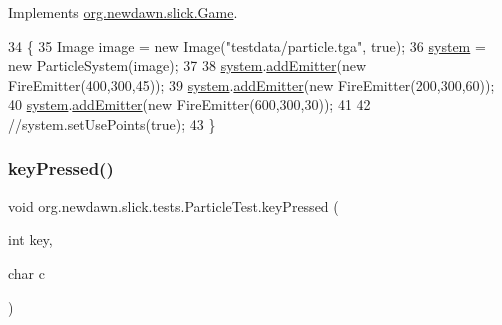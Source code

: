 Implements \mbox{\hyperlink{interfaceorg_1_1newdawn_1_1slick_1_1_game_ad2dd6affab08bb8fdb5fab0815957b7a}{org.\+newdawn.\+slick.\+Game}}.


\begin{DoxyCode}
34                                                                     \{
35         Image image = \textcolor{keyword}{new} Image(\textcolor{stringliteral}{"testdata/particle.tga"}, \textcolor{keyword}{true});
36         \mbox{\hyperlink{classorg_1_1newdawn_1_1slick_1_1tests_1_1_particle_test_a6daed8a7245faff147f4e66159df9c0d}{system}} = \textcolor{keyword}{new} ParticleSystem(image);
37         
38         \mbox{\hyperlink{classorg_1_1newdawn_1_1slick_1_1tests_1_1_particle_test_a6daed8a7245faff147f4e66159df9c0d}{system}}.\mbox{\hyperlink{classorg_1_1newdawn_1_1slick_1_1particles_1_1_particle_system_abeb4a1cb7f8677cf28b82f1e49f1f0ce}{addEmitter}}(\textcolor{keyword}{new} FireEmitter(400,300,45));
39         \mbox{\hyperlink{classorg_1_1newdawn_1_1slick_1_1tests_1_1_particle_test_a6daed8a7245faff147f4e66159df9c0d}{system}}.\mbox{\hyperlink{classorg_1_1newdawn_1_1slick_1_1particles_1_1_particle_system_abeb4a1cb7f8677cf28b82f1e49f1f0ce}{addEmitter}}(\textcolor{keyword}{new} FireEmitter(200,300,60));
40         \mbox{\hyperlink{classorg_1_1newdawn_1_1slick_1_1tests_1_1_particle_test_a6daed8a7245faff147f4e66159df9c0d}{system}}.\mbox{\hyperlink{classorg_1_1newdawn_1_1slick_1_1particles_1_1_particle_system_abeb4a1cb7f8677cf28b82f1e49f1f0ce}{addEmitter}}(\textcolor{keyword}{new} FireEmitter(600,300,30));
41         
42         \textcolor{comment}{//system.setUsePoints(true);}
43     \}
\end{DoxyCode}
\mbox{\label{classorg_1_1newdawn_1_1slick_1_1tests_1_1_particle_test_a8be587ab4a9deee4b9891ac1053ccbf3}} 
\subsubsection{\texorpdfstring{key\+Pressed()}{keyPressed()}}
{\footnotesize\ttfamily void org.\+newdawn.\+slick.\+tests.\+Particle\+Test.\+key\+Pressed (\begin{DoxyParamCaption}\item[{int}]{key,  }\item[{char}]{c }\end{DoxyParamCaption})\hspace{0.3cm}{\ttfamily [inline]}}

